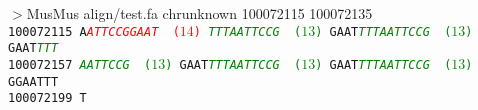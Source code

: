 \documentclass[11pt,twoside,reqno,a4paper]{article}
\begin{document}
\noindent
$>$MusMus	align/test.fa	chrunknown	100072115	100072135 \\
\texttt{100072115	A\textit{\textcolor{red}{ATTCCGGAAT}} \textcolor{red}{ ($14$)} \textit{\textcolor{green}{TTTAATTCCG}} \textcolor{green}{ ($13$)} GAAT\textit{\textcolor{green}{TTTAATTCCG}} \textcolor{green}{ ($13$)} GAAT\textit{\textcolor{green}{TTT}}\\
100072157	\textit{\textcolor{green}{AATTCCG}} \textcolor{green}{ ($13$)} GAAT\textit{\textcolor{green}{TTTAATTCCG}} \textcolor{green}{ ($13$)} GAAT\textit{\textcolor{green}{TTTAATTCCG}} \textcolor{green}{ ($13$)} GGAATTT\\
100072199	T}
\\
\\
\end{document}

